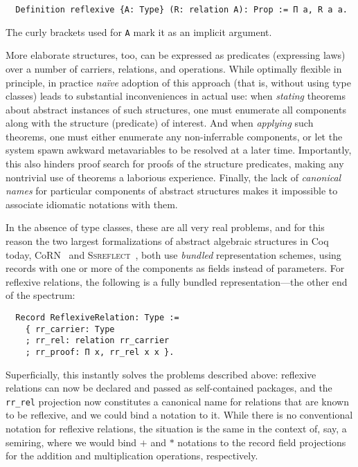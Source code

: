 \documentclass[a4paper,10pt,runningheads]{llncs}
\begin{document}
\begin{lstlisting}
  Definition reflexive {A: Type} (R: relation A): Prop := Π a, R a a.
\end{lstlisting}
The curly brackets used for \lstinline|A| mark it as an implicit argument.

More elaborate structures, too, can be expressed as predicates (expressing laws) over a number of carriers, relations, and operations. While optimally flexible in principle, in practice \emph{na\"ive} adoption of this approach (that is, without using type classes) leads to substantial inconveniences in actual use: when \emph{stating} theorems about abstract instances of such structures, one must enumerate all components along with the structure (predicate) of interest. And when \emph{applying} such theorems, one must either enumerate any non-inferrable components, or let the system spawn awkward metavariables to be resolved at a later time. Importantly, this also hinders proof search for proofs of the structure predicates, making any nontrivial use of theorems a laborious experience. Finally, the lack of \emph{canonical names} for particular components of abstract structures makes it impossible to associate idiomatic notations with them.


In the absence of type classes, these are all very real problems, and for this reason the two largest formalizations of abstract algebraic structures in Coq today, CoRN~\cite{C-corn} and \textsc{Ssreflect}~\cite{Packed}, both use \emph{bundled} representation schemes, using records with one or more of the components as fields instead of parameters. For reflexive relations, the following is a fully bundled representation---the other end of the spectrum:
\begin{lstlisting}
  Record ReflexiveRelation: Type :=
    { rr_carrier: Type
    ; rr_rel: relation rr_carrier
    ; rr_proof: Π x, rr_rel x x }.
\end{lstlisting}
Superficially, this instantly solves the problems described above: reflexive relations can now be declared and passed as self-contained packages, and the \lstinline|rr_rel| projection now constitutes a canonical name for relations that are known to be reflexive, and we could bind a notation to it. While there is no conventional notation for reflexive relations, the situation is the same in the context of, say, a semiring, where we would bind $+$ and $*$ notations to the record field projections for the addition and multiplication operations, respectively.
\end{document}
